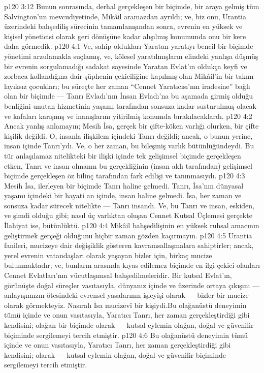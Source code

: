 \vs p120 3:12 Bunun sonrasında, derhal gerçekleşen bir biçimde, bir araya gelmiş tüm Salvington’un mevcudiyetinde, Mikâil aramazdan ayrıldı; ve, biz onu, Urantia üzerindeki bahşediliş sürecinin tamamlanışından sonra, evrenin en yüksek ve kişisel yöneticisi olarak geri dönüşüne kadar alışılmış konumunda onu bir kere daha görmedik.
\vs p120 4:1 Ve, sahip oldukları Yaratan\hyp{}yaratıyı bencil bir biçimde yönetimi arzulamakla suçlamış, ve, kölesel yaratılmışların elindeki yanlışa düşmüş bir evrenin sorgulamadığı sadakat sayesinde Yaratan Evlat’ın oldukça keyfi ve zorbaca kollandığına dair şüphenin çekiciliğine kapılmış olan Mikâil’in bir takım layıksız çocukları; bu süreçte her zaman “Cennet Yaratıcısı’nın iradesine” bağlı olan bir biçimde --- Tanrı Evladı’nın İnsan Evladı’na bu aşamada girmiş olduğu benliğini unutan hizmetinin yaşamı tarafından sonsuza kadar susturulmuş olacak ve kafaları karışmış ve inanışlarını yitirilmiş konumda bırakılacaklardı.
\vs p120 4:2 Ancak yanlış anlamayın; Mesih İsa, gerçek bir çifte\hyp{}köken varlığı olurken, bir çifte kişilik değildi. O, insanla  ilişkilem içindeki Tanrı değildi; ancak, o bunun yerine, insan içinde  Tanrı’ydı. Ve, o her zaman, bu bileşmiş varlık bütünlüğündeydi. Bu tür anlaşılamaz nitelikteki bir ilişki içinde tek gelişimsel biçimde gerçekleşen etken, Tanrı ve insan olmanın bu gerçekliğinin (insan aklı tarafından) gelişimsel biçimde gerçekleşen öz bilinç tarafından fark edilişi ve tanınmasıydı.
\vs p120 4:3 Mesih İsa, ilerleyen bir biçimde Tanrı haline gelmedi. Tanrı, İsa’nın dünyasal yaşamı içindeki bir hayati an içinde, insan haline gelmedi. İsa, her zaman ve sonsuza kadar sürecek nitelikte --- Tanrı  insandı. Ve, bu Tanrı ve insan, eskiden, ve şimdi olduğu gibi; nasıl üç varlıktan oluşan Cennet Kutsal Üçlemesi gerçekte  İlahiyat ise,  bütünlüktü.
\vs p120 4:4 Mikâil bahşedilişinin en yüksek ruhsal amacının  geliştirmek gerçeği olduğunu hiçbir zaman gözden kaçırmayın.
\vs p120 4:5 Urantia fanileri, mucizeye dair değişiklik gösteren kavramsallaşmalara sahiptirler; ancak, yerel evrenin vatandaşları olarak yaşayan bizler için, birkaç mucize bulunmaktadır; ve, bunların arasında kıyas edilemez biçimde en ilgi çekici olanları Cennet Evlatları’nın vücutlaşımsal bahşedilmeleridir. Bir kutsal Evlat’ın, görünüşte doğal süreçler vasıtasıyla, dünyanız içinde ve üzerinde ortaya çıkışını --- anlayışımızın ötesindeki evrensel yasalarının işleyişi olarak --- bizler bir mucize olarak görmekteyiz. Nasıralı İsa mucizevî bir kişiydi.Bu olağanüstü deneyimin tümü içinde ve onun vasıtasıyla, Yaratıcı Tanrı, her zaman gerçekleştirdiği gibi kendisini; olağan bir biçimde olarak --- kutsal eylemin olağan, doğal ve güvenilir biçiminde sergilemeyi tercih etmiştir.
\vs p120 4:6 Bu olağanüstü deneyimin tümü içinde ve onun vasıtasıyla, Yaratıcı Tanrı, her zaman gerçekleştirdiği gibi kendisini;  olarak --- kutsal eylemin olağan, doğal ve güvenilir biçiminde sergilemeyi tercih etmiştir.
